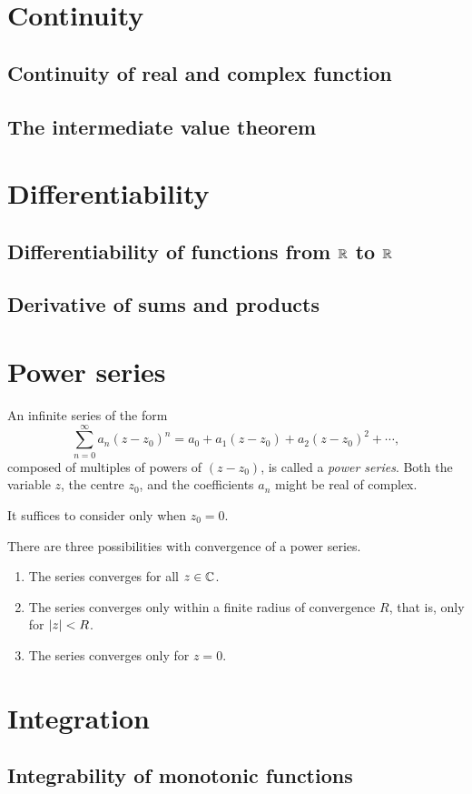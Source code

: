 \documentclass[main.tex]{subfiles}
\begin{document}
	\section{Continuity}
	\subsection{Continuity of real and complex function}
	
	\subsection{The intermediate value theorem}
	
	\section{Differentiability}
	\subsection{Differentiability of functions from $\mathbb R$ to $\mathbb R$}
	
	\subsection{Derivative of sums and products}
	
	\section{Power series}
	\begin{definition}
		An infinite series of the form
		\begin{equation*}
		\sum_{n = 0}^{\infty} a_n(z - z_0)^n = a_0 + a_1 (z - z_0) + a_2 (z - z_0)^2 + \cdots,
		\end{equation*}
		composed of multiples of powers of $(z - z_0)$, is called a \textit{power series}. Both the variable $z$, the centre $z_0$, and the coefficients $a_n$ might be real of complex.
		
		It suffices to consider only when $z_0 = 0$.
	\end{definition}
	There are three possibilities with convergence of a power series.
	\begin{enumerate}
		\item The series converges for all $z \in \mathbb C$.
		\item The series converges only within a finite radius of convergence $R$, that is, only for $\lvert z\rvert < R$.
		\item The series converges only for $z = 0$.
	\end{enumerate}
	
	\section{Integration}
	\subsection{Integrability of monotonic functions}
	
\end{document}
